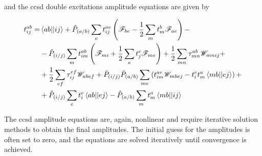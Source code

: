 \documentclass[open=any,parskip=half,11pt]{scrbook}
\begin{document}
and the \acrshort{ccsd} double excitations amplitude equations are given by

\begin{align}
t_{ij}^{ab}=&\braket{ab||ij}+\hat{P}_{(a/b)}\sum_et_{ij}^{ae}\left(\mathscr{F}_{be}-\frac{1}{2}\sum_mt_m^b\mathscr{F}_{ae}\right)- \\
&-\hat{P}_{(i/j)}\sum_mt_{im}^{ab}\left(\mathscr{F}_{mi}+\frac{1}{2}\sum_et_j^e\mathscr{F}_{me}\right)+\frac{1}{2}\sum_{mn}\tau_{mn}^{ab}\mathscr{W}_{mnij}+ \\
&+\frac{1}{2}\sum_{ef}\tau_{ij}^{ef}\mathscr{W}_{abef}+\hat{P}_{(i/j)}\hat{P}_{(a/b)}\sum_{me}\left(t_{im}^{ae}\mathscr{W}_{mbej}-t_i^et_m^a\braket{mb||ej}\right)+ \\
&+\hat{P}_{(i/j)}\sum_et_i^e\braket{ab||ej}-\hat{P}_{(a/b)}\sum_mt_m^a\braket{mb||ij}
\end{align}

The \acrshort{ccsd} amplitude equations are, again, nonlinear and require iterative solution methods to obtain the final amplitudes. The initial guess for the amplitudes is often set to zero, and the equations are solved iteratively until convergence is achieved.

\printglossary[type=\acronymtype,title=List of Acronyms,toctitle=List of Acronyms]
\end{document}
